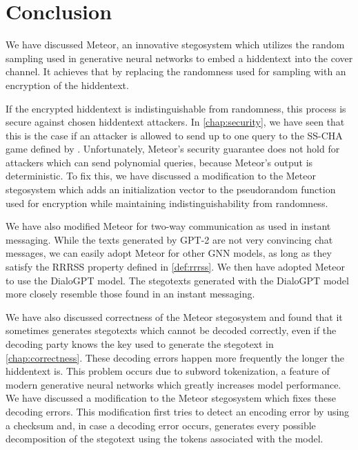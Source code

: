 \chapter{Conclusion}
\label{chap:conclusion}




%

We have discussed Meteor, an innovative stegosystem which utilizes the random sampling used in generative neural networks to embed a hiddentext into the cover channel.
It achieves that by replacing the randomness used for sampling with an encryption of the hiddentext.

If the encrypted hiddentext is indistinguishable from randomness, this process is secure against chosen hiddentext attackers.
In \autoref{chap:security}, we have seen that this is the case if an attacker is allowed to send up to one query to the SS-CHA game defined by \cite{Hopper2004}.
Unfortunately, Meteor's security guarantee does not hold for attackers which can send polynomial queries, because Meteor's output is deterministic.
To fix this, we have discussed a modification to the Meteor stegosystem which adds an initialization vector to the pseudorandom function used for encryption while maintaining indistinguishability from  randomness.

We have also modified Meteor for two-way communication as used in instant messaging.
While the texts generated by GPT-2 are not very convincing chat messages, we can easily adopt Meteor for other GNN models, as long as they satisfy the RRRSS property defined in \autoref{def:rrrss}.
We then have adopted Meteor to use the DialoGPT model.
The stegotexts generated with the DialoGPT model more closely resemble those found in an instant messaging.

We have also discussed correctness of the Meteor stegosystem and found that it sometimes generates stegotexts which cannot be decoded correctly, even if the decoding party knows the key used to generate the stegotext in \autoref{chap:correctness}.
These decoding errors happen more frequently the longer the hiddentext is.
This problem occurs due to subword tokenization, a feature of modern generative neural networks which greatly increases model performance.
We have discussed a modification to the Meteor stegosystem which fixes these decoding errors.
This modification first tries to detect an encoding error by using a checksum and, in case a decoding error occurs, generates every possible decomposition of the stegotext using the tokens associated with the model.

